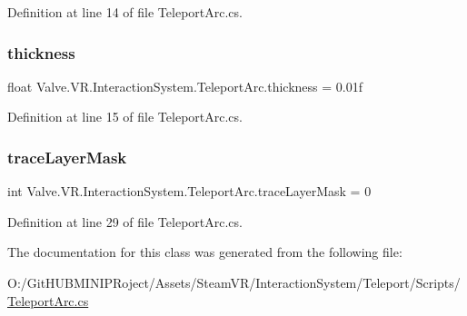 Definition at line 14 of file Teleport\+Arc.\+cs.

\mbox{\label{class_valve_1_1_v_r_1_1_interaction_system_1_1_teleport_arc_a36ba65ade47cede067b4687ef9d4b330}} 
\subsubsection{\texorpdfstring{thickness}{thickness}}
{\footnotesize\ttfamily float Valve.\+V\+R.\+Interaction\+System.\+Teleport\+Arc.\+thickness = 0.\+01f}



Definition at line 15 of file Teleport\+Arc.\+cs.

\mbox{\label{class_valve_1_1_v_r_1_1_interaction_system_1_1_teleport_arc_a655a026794c332f906afdbe6bf50b937}} 
\subsubsection{\texorpdfstring{traceLayerMask}{traceLayerMask}}
{\footnotesize\ttfamily int Valve.\+V\+R.\+Interaction\+System.\+Teleport\+Arc.\+trace\+Layer\+Mask = 0}



Definition at line 29 of file Teleport\+Arc.\+cs.



The documentation for this class was generated from the following file\+:\begin{DoxyCompactItemize}
\item 
O\+:/\+Git\+H\+U\+B\+M\+I\+N\+I\+P\+Roject/\+Assets/\+Steam\+V\+R/\+Interaction\+System/\+Teleport/\+Scripts/\mbox{\hyperlink{_teleport_arc_8cs}{Teleport\+Arc.\+cs}}\end{DoxyCompactItemize}
